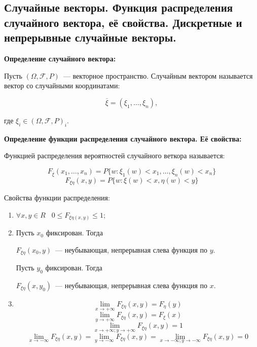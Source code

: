 \subsection{Случайные векторы. Функция распределения случайного вектора,
её свойства. Дискретные и непрерывные случайные векторы.}

\textbf{Определение случайного вектора:}
    \smallskip

    Пусть $(\Omega, \mathcal{F}, P)$~--- векторное пространство. Случайным вектором
    называется вектор со случайными координатами:

    \[
        \overline{\xi} = (\xi_1, \dots, \xi_n),  
    \]

    где $\xi_i \in (\Omega, \mathcal{F}, P)_i$.
    \bigskip

\textbf{Определение функции распределения случайного вектора. Её свойства:}
    \smallskip
    
    Функцией распределения вероятностей случайного веткора называется:

    \[
        F_{\overline{\xi}}(x_1, \dots, x_n) = P\{w: \xi_1(w) < x_1, \dots,
        \xi_n(w) < x_n\} 
    \]
    \[
        F_{\xi \eta} (x, y) = P\{w: \xi(w) < x, \eta(w) < y\}  
    \]
    \bigskip

    Свойства функции распределения:
    \begin{enumerate}
        \item{$\forall x, y \in R \;\;\; 0 \leq F_{\xi \eta (x, y)} \leq 1$;}
        \item{Пусть $x_0$ фиксирован. Тогда
        
        $F_{\xi \eta} (x_0, y)$~--- неубывающая, непрерывная слева функция 
        по $y$.
        \bigskip
        
        Пусть $y_0$ фиксирован. Тогда 
        
        $F_{\xi \eta} (x, y_0)$~--- неубывающая, непрерывная слева функция 
        по $x$.}
        \item{
            \[
                \lim_{x \to +\infty} F_{\xi \eta} (x, y) = F_{\eta} (y)  
            \]
            \[
                \lim_{y \to +\infty} F_{\xi \eta} (x, y) = F_{\xi} (x)
            \]
            \[
                \lim_{x \to +\infty; y \to +\infty} F_{\xi \eta} (x, y) = 1 
            \]
            \[
                \lim_{x \to -\infty} F_{\xi \eta} (x, y) = 
                \lim_{y \to -\infty} F_{\xi \eta} (x, y) =
                \lim_{x \to -\infty; y \to -\infty} F_{\xi \eta} (x, y) = 0
            \]
        }
    \end{enumerate}

